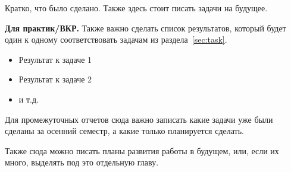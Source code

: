 
Кратко, что было сделано. Также здесь стоит писать задачи на будущее.

\textbf{Для практик/ВКР.} Также важно сделать список результатов, который будет один к одному соответствовать задачам из раздела~\ref{sec:task}.

\begin{itemize}
\item Результат к задаче 1 
\item Результат к задаче 2
\item и т.д.
\end{itemize}
\noindent Для промежуточных отчетов сюда важно записать какие задачи уже были сделаны за осенний семестр, а какие только планируется сделать.

Также сюда можно писать планы развития работы в будущем, или, если их много, выделять под это отдельную главу.

